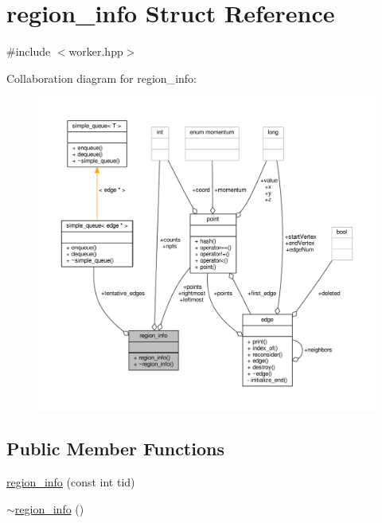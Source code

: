 \hypertarget{structregion__info}{\section{region\-\_\-info Struct Reference}
\label{structregion__info}
}


{\ttfamily \#include $<$worker.\-hpp$>$}



Collaboration diagram for region\-\_\-info\-:
\nopagebreak
\begin{figure}[H]
\begin{center}
\leavevmode
\includegraphics[width=350pt]{structregion__info__coll__graph}
\end{center}
\end{figure}
\subsection*{Public Member Functions}
\begin{DoxyCompactItemize}
\item 
\hyperlink{structregion__info_a1a31f687c266bbd4f42cf7cf572ef6e1}{region\-\_\-info} (const int tid)
\item 
\hyperlink{structregion__info_ae4516649684be4a6f435490368fcbe3d}{$\sim$region\-\_\-info} ()
\end{DoxyCompactItemize}
